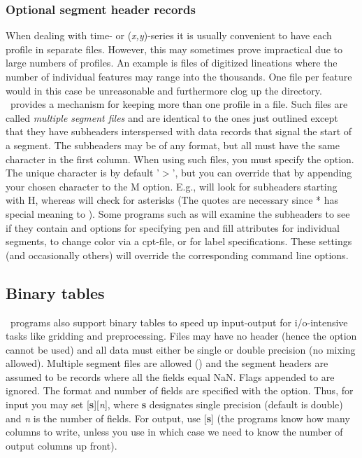 \subsubsection{Optional segment header records}
When dealing with time- or ({\it x,y})-series it is usually
convenient to have each profile in separate files.
However, this may sometimes prove impractical due to large numbers
of profiles.  An example is files of digitized lineations where
the number of individual features may range into the thousands.
One file per feature would in this case be unreasonable and
furthermore clog up the directory. \GMT\ provides a mechanism for
keeping more than one profile in a file.  Such files are called
\emph{multiple segment files} and are identical to the ones
just outlined except that they have subheaders interspersed with
data records that signal the start of a segment.
The subheaders may be of any format, but all must have the same
character in the first column.  When using such files, you must
specify the  option.  The unique character is by default
'$>$', but you can override that by appending your chosen character
to the M option.  E.g.,  will look for subheaders starting
with H, whereas  will check for asterisks (The quotes
are necessary since * has special meaning to \UNIX).  Some programs
such as  will examine the subheaders to see if they
contain  and  options for specifying pen and
fill attributes for individual segments,  to change
color via a cpt-file, or  for label specifications.  These settings
(and occasionally others) will override the corresponding command line options.

\subsection{Binary tables}

\GMT\ programs also support binary tables to speed up input-output
for i/o-intensive tasks like gridding and preprocessing.  Files
may have no header (hence the  option cannot be used)
and all data must either be single or double precision (no mixing
allowed).  Multiple segment files are allowed () and the
segment headers are assumed to be records where all the fields equal 
NaN.  Flags appended to  are ignored.  The format and number
of fields are specified with the
 option.  Thus, for input you may set [{\bf s}][{\it n}],
where {\bf s} designates single precision (default is double) and
{\it n} is the number of fields.  For output, use [{\bf s}] 
(the programs know how many columns to write, unless you use  in which
case we need to know the number of output columns up front).

